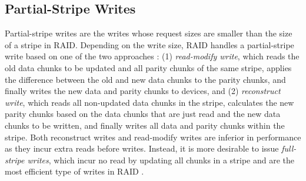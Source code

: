 


\subsection{Partial-Stripe Writes}


Partial-stripe writes are the writes whose request sizes are smaller than the
size of a stripe in RAID.  Depending on the write size, RAID handles a 
partial-stripe write based on one of the two approaches \cite{chen95}: (1)
\textit{read-modify write}, which reads the old data chunks to be updated and
all parity chunks of the same stripe, applies the difference between the old
and new data chunks to the parity chunks, and finally writes the new data and
parity chunks to devices, and (2) \textit{reconstruct write}, which reads all
non-updated data chunks in the stripe,  calculates the new parity chunks based
on the data chunks that are just read and the new data chunks to be written,
and finally writes all data and parity chunks within the stripe.  Both
reconstruct writes and read-modify writes are inferior in performance as they
incur extra reads before writes.  Instead, it is more desirable to issue 
{\em full-stripe writes}, which incur no read by updating all chunks in a stripe 
and are the most efficient type of writes in RAID \cite{chen95}. 

